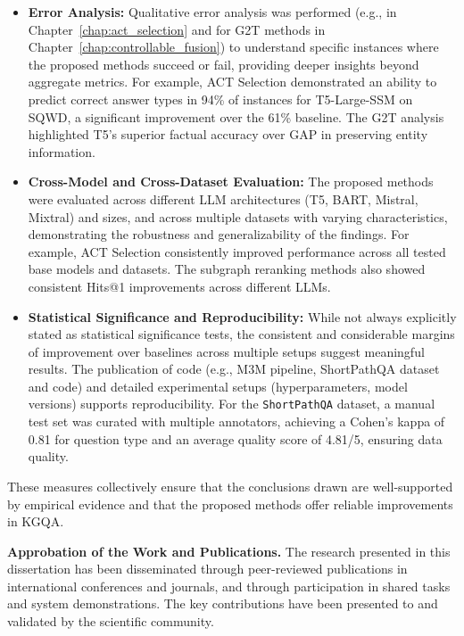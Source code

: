 \begin{itemize}
    \item \textbf{Error Analysis:} Qualitative error analysis was performed (e.g., in Chapter~\ref{chap:act_selection} and for G2T methods in Chapter~\ref{chap:controllable_fusion}) to understand specific instances where the proposed methods succeed or fail, providing deeper insights beyond aggregate metrics. For example, ACT Selection demonstrated an ability to predict correct answer types in 94\% of instances for T5-Large-SSM on SQWD, a significant improvement over the 61\% baseline. The G2T analysis highlighted T5's superior factual accuracy over GAP in preserving entity information.
    \item \textbf{Cross-Model and Cross-Dataset Evaluation:} The proposed methods were evaluated across different LLM architectures (T5, BART, Mistral, Mixtral) and sizes, and across multiple datasets with varying characteristics, demonstrating the robustness and generalizability of the findings. For example, ACT Selection consistently improved performance across all tested base models and datasets. The subgraph reranking methods also showed consistent Hits@1 improvements across different LLMs.
    \item \textbf{Statistical Significance and Reproducibility:} While not always explicitly stated as statistical significance tests, the consistent and considerable margins of improvement over baselines across multiple setups suggest meaningful results. The publication of code (e.g., M3M pipeline, ShortPathQA dataset and code) and detailed experimental setups (hyperparameters, model versions) supports reproducibility. For the \texttt{ShortPathQA} dataset, a manual test set was curated with multiple annotators, achieving a Cohen's kappa of 0.81 for question type and an average quality score of 4.81/5, ensuring data quality.
\end{itemize}
These measures collectively ensure that the conclusions drawn are well-supported by empirical evidence and that the proposed methods offer reliable improvements in KGQA.

\textbf{Approbation of the Work and Publications.}
The research presented in this dissertation has been disseminated through peer-reviewed publications in international conferences and journals, and through participation in shared tasks and system demonstrations. The key contributions have been presented to and validated by the scientific community.

